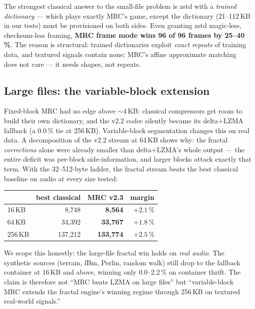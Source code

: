 \documentclass[11pt,a4paper]{article}
\begin{document}
The strongest classical answer to the small-file problem is zstd with a
\emph{trained dictionary} --- which plays exactly MRC's game, except the
dictionary (21--112\,KB in our tests) must be provisioned on both sides. Even
granting zstd magic-less, checksum-less framing, \textbf{MRC frame mode wins
96 of 96 frames by 25--40\,\%}. The reason is structural: trained dictionaries
exploit \emph{exact repeats} of training data, and textured signals contain
none; MRC's affine approximate matching does not care --- it needs shapes, not
repeats.

\subsection{Large files: the variable-block extension}
\label{sec:large}

Fixed-block MRC had no edge above ${\sim}4$\,KB: classical compressors get
room to build their own dictionary, and the v2.2 codec silently became its
delta+LZMA fallback (a 0.0\,\% tie at 256\,KB). Variable-block segmentation
changes this on real data. A decomposition of the v2.2 stream at 64\,KB shows
why: the fractal \emph{corrections} alone were already smaller than
delta+LZMA's whole output --- the entire deficit was per-block
side-information, and larger blocks attack exactly that term. With the
32--512-byte ladder, the fractal stream beats the best classical baseline on
audio at every size tested:

\begin{center}
\small
\begin{tabular}{lrrr}
\toprule
 & best classical & MRC v2.3 & margin \\
\midrule
16\,KB  & 8{,}748   & \textbf{8{,}564}   & $+2.1\,\%$ \\
64\,KB  & 34{,}392  & \textbf{33{,}767}  & $+1.8\,\%$ \\
256\,KB & 137{,}212 & \textbf{133{,}774} & $+2.5\,\%$ \\
\bottomrule
\end{tabular}
\end{center}

We scope this honestly: the large-file fractal win holds on \emph{real audio}.
The synthetic sources (terrain, fBm, Perlin, random walk) still drop to the
fallback container at 16\,KB and above, winning only 0.0--2.2\,\% on container
thrift. The claim is therefore not ``MRC beats LZMA on large files'' but
``variable-block MRC extends the fractal engine's winning regime through
256\,KB on textured real-world signals.''
\end{document}
